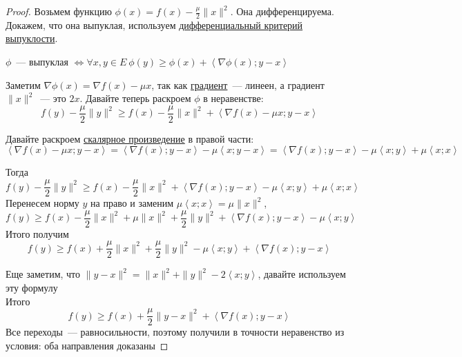 \begin{proof}
  Возьмем функцию $\phi(x) = f(x) - \frac{\mu}{2} \|x\|^2$. Она  дифференцируема.
  Докажем, что она выпуклая, используем \hyperref[note:18BD8497-CEBD-4962-8144-474B489606C3]{дифференциальный критерий выпуклости}.

  $\phi$~--- выпуклая $\Leftrightarrow \forall x,y \in E\ \phi(y) \ge \phi(x) + \left\langle \nabla \phi(x); y-x \right\rangle$

  Заметим $\nabla \phi(x) = \nabla f(x) - \mu x$, так как \hyperref[note:1756907B-1FF2-4F62-8553-759B8509281C]{градиент}~--- линеен, а градиент $\|x\|^2$~--- это $2x$.
  Давайте теперь раскроем $\phi$ в неравенстве:
  \[
  f(y) - \frac{\mu}{2} \| y \|^2 \ge f(x) - \frac{\mu}{2} \| x \|^2 + \left\langle \nabla f(x) - \mu x; y-x \right\rangle
  \]

  Давайте раскроем \hyperref[note:F2942E98-6115-4600-AA3F-E0F687D9C732]{скалярное произведение} в правой части:
  \[
  \left\langle \nabla f(x) - \mu x; y-x \right\rangle =  \left\langle \nabla f(x); y-x \right\rangle - \mu \left\langle x; y - x \right\rangle =  \left\langle \nabla f(x); y-x \right\rangle - \mu \left\langle x; y \right\rangle  +  \mu \left\langle x; x \right\rangle
  \]

  Тогда
  \[
  f(y) - \frac{\mu}{2} \| y \|^2  \ge f(x) - \frac{\mu}{2} \|x\|^2 + \left\langle \nabla f(x); y-x \right\rangle - \mu \left\langle x; y \right\rangle  +  \mu \left\langle x; x \right\rangle
  \]
  Перенесем норму $y$ на право и заменим $\mu \left\langle x;x \right\rangle = \mu \|x \|^{2}$,
  \[
  f(y) \ge f(x) - \frac{\mu}{2} \| x \|^2 + \mu \| x \|^2 + \frac{\mu}{2} \| y \|^2 + \left\langle \nabla f(x); y-x \right\rangle - \mu \left\langle x;y \right\rangle
  \]
  Итого получим
  \[
  f (y) \ge f(x) + \frac{\mu}{2} \| x \|^2 + \frac{\mu}{2} \| y \|^2 - \mu \left\langle x;y \right\rangle + \left\langle \nabla f(x); y-x \right\rangle
  \]

  Еще заметим, что  $\|y-x\|^2 = \|x\|^2 +\|y\|^2 - 2 \left\langle x;y \right\rangle$, давайте используем эту формулу \\
  Итого
  \[
  f(y) \ge f(x) + \frac{\mu}{2} \|y-x\|^2 + \left\langle \nabla f(x); y-x \right\rangle
  \]
  Все переходы~--- равносильности, поэтому получили в точности неравенство из условия: оба направления доказаны
\end{proof}

